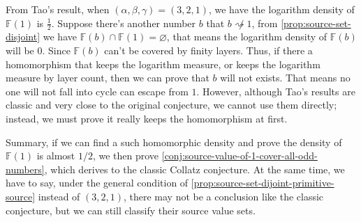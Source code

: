 From Tao's result\cite{tao2022orbitscollatzmapattain}, when $(\alpha, \beta, \gamma) = (3, 2, 1)$, we have the logarithm density of $\mathbb{F}(1)$ is $\frac{1}{2}$. Suppose there's another number $b$ that $b \not\rightsquigarrow 1$, from \cref{prop:source-set-disjoint} we have $\mathbb{F}(b)\cap\mathbb{F}(1) = \varnothing$, that means the logarithm density of $\mathbb{F}(b)$ will be $0$. Since $\mathbb{F}(b)$ can't be covered by finity layers. Thus, if there a homomorphism that keeps the logarithm measure, or keeps the logarithm measure by layer count, then we can prove that $b$ will not exists. That means no one will not fall into cycle can escape from $1$. However, although Tao's results are classic and very close to the original conjecture, we cannot use them directly; instead, we must prove it really keeps the homomorphism at first.

Summary, if we can find a such homomorphic density and prove the density of $\mathbb{F}(1)$ is almost $1/2$, we then prove \cref{conj:source-value-of-1-cover-all-odd-numbers}, which derives to the classic Collatz conjecture. 
At the same time, we have to say, under the general condition of \cref{prop:source-set-dijoint-primitive-source} instead of $(3,2,1)$, there may not be a conclusion like the classic conjecture, but we can still classify their source value sets.

